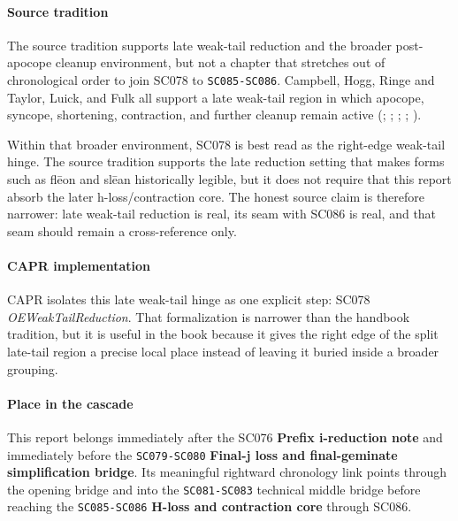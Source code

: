 \documentclass[
  british,
  a4paper,
]{article}
\begin{document}
\paragraph{Source tradition}\label{source-tradition-48}

The source tradition supports late weak-tail reduction and the broader
post-apocope cleanup environment, but not a chapter that stretches out
of chronological order to join SC078 to \texttt{SC085-SC086}. Campbell,
Hogg, Ringe and Taylor, Luick, and Fulk all support a late weak-tail
region in which apocope, syncope, shortening, contraction, and further
cleanup remain active (; ;
; ; ).

Within that broader environment, SC078 is best read as the right-edge
weak-tail hinge. The source tradition supports the late reduction
setting that makes forms such as flēon and slēan historically legible,
but it does not require that this report absorb the later
h-loss/contraction core. The honest source claim is therefore narrower:
late weak-tail reduction is real, its seam with SC086 is real, and that
seam should remain a cross-reference only.

\paragraph{CAPR implementation}\label{capr-implementation-48}

CAPR isolates this late weak-tail hinge as one explicit step: SC078
\emph{OEWeakTailReduction}. That formalization is narrower than the
handbook tradition, but it is useful in the book because it gives the
right edge of the split late-tail region a precise local place instead
of leaving it buried inside a broader grouping.

\paragraph{Place in the cascade}\label{place-in-the-cascade-48}

This report belongs immediately after the SC076 \textbf{Prefix
i-reduction note} and immediately before the \texttt{SC079-SC080}
\textbf{Final-j loss and final-geminate simplification bridge}. Its
meaningful rightward chronology link points through the opening bridge
and into the \texttt{SC081-SC083} technical middle bridge before
reaching the \texttt{SC085-SC086} \textbf{H-loss and contraction core}
through SC086.
\end{document}
